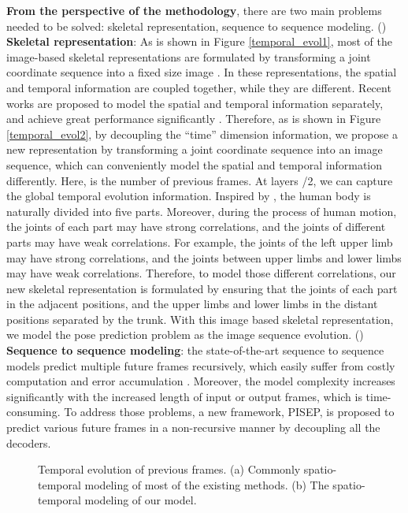 \documentclass[journal]{IEEEtran}
\begin{document}
{\bf From the perspective of the methodology}, there are two main problems needed to be solved: skeletal representation, sequence to sequence modeling. () {\bf Skeletal representation}: As is shown in Figure \ref{temporal_evol1}, most of the image-based skeletal representations are formulated by transforming a joint coordinate sequence into a fixed size image \cite{Kenew,ChaoHCN,DuSAR,skecnn2017,jdmcnn,rltdsbar,lcrsbar,vihar3dbio}. In these representations, the spatial and temporal information are coupled together, while they are different. Recent works are proposed to model the spatial and temporal information separately, and achieve great performance significantly \cite{timeception,tscnn,rstfl,arnvc,s21nar}. Therefore, as is shown in Figure \ref{temporal_evol2}, by decoupling the ``time'' dimension information, we propose a new representation by transforming a joint coordinate sequence into an image sequence, which can conveniently model the spatial and temporal   information differently. Here,  is the number of previous frames. At layers /2, we can capture the global temporal evolution information. Inspired by \cite{srnnar2015,biodsf2013}, the human body is naturally divided into five parts. Moreover, during the process of human motion, the joints of each part may have strong correlations, and the joints of different parts may have weak correlations. For example, the joints of the left upper limb may have strong correlations, and the joints between upper limbs and lower limbs may have weak correlations. Therefore, to model those different correlations, our new skeletal representation is formulated by ensuring that the joints of each part in the adjacent positions, and the upper limbs and lower limbs in the distant positions separated by the trunk. With this image based skeletal representation, we model the pose prediction problem as the image sequence evolution. () {\bf Sequence to sequence modeling}: the state-of-the-art sequence to sequence models predict multiple future frames recursively, which easily suffer from costly computation and error accumulation \cite{predcnn,MartinezOMP,Guifewshot,predrnn}. Moreover, the model complexity increases significantly with the increased length of input or output frames, which is time-consuming. To address those problems, a new framework, PISEP, is proposed to predict various future frames in a non-recursive manner by decoupling all the decoders.


\begin{figure}[!t]
\centering
{}
\hfil
{}
\caption{Temporal evolution of previous frames. (a) Commonly spatio-temporal modeling of most of the existing methods. (b) The spatio-temporal modeling of our model.}
\label{temporal_evol}
\end{figure}
\end{document}

